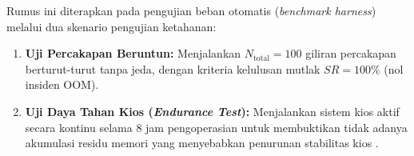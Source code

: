Rumus ini diterapkan pada pengujian beban otomatis (\textit{benchmark harness}) melalui dua skenario pengujian ketahanan:
\begin{enumerate}
    \item \textbf{Uji Percakapan Beruntun:} Menjalankan $N_{\text{total}} = 100$ giliran percakapan berturut-turut tanpa jeda, dengan kriteria kelulusan mutlak $SR = 100\%$ (nol insiden OOM).
    \item \textbf{Uji Daya Tahan Kios (\textit{Endurance Test}):} Menjalankan sistem kios aktif secara kontinu selama 8 jam pengoperasian untuk membuktikan tidak adanya akumulasi residu memori yang menyebabkan penurunan stabilitas kios \cite{hossain2023role}.
\end{enumerate}
